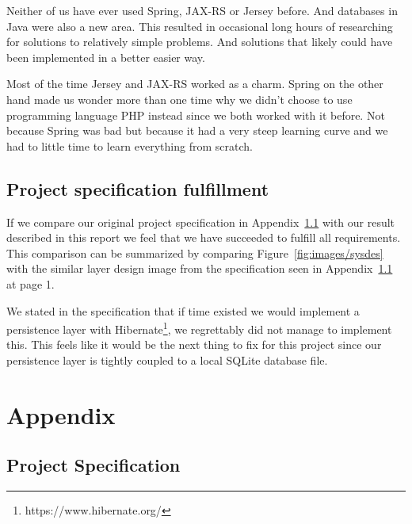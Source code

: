 \documentclass[titlepage, twocolumn, a4paper, 10pt]{article}
\begin{document}
Neither of us have ever used Spring, JAX-RS or Jersey before. And
databases in Java were also a new area. This resulted in occasional
long hours of researching for solutions to relatively simple problems.
And solutions that likely could have been implemented in a better
easier way.

Most of the time Jersey and JAX-RS worked as a charm. Spring on the
other hand made us wonder more than one time why we didn't choose to
use programming language PHP instead since we both worked with it
before. Not because Spring was bad but because it had a very steep
learning curve and we had to little time to learn everything from
scratch.

\subsection{Project specification fulfillment}
If we compare our original project specification in
Appendix~\ref{app:ps} with our result described in this report we feel
that we have succeeded to fulfill all requirements. This comparison
can be summarized by comparing Figure~\vref{fig:images/sysdes} with
the similar layer design image from the specification seen in
Appendix~\ref{app:ps} at page 1.

We stated in the specification that if time existed we would implement
a persistence layer with
Hibernate\footnote{https://www.hibernate.org/}, we regrettably did not
manage to implement this. This feels like it would be the next thing
to fix for this project since our persistence layer is tightly coupled
to a local SQLite database file.
% 
% 

\newpage
\onecolumn
\appendix
{}
\section{Appendix}\label{sec:app}
\subsection{Project Specification}\label{app:ps}
\newpage
\end{document}
